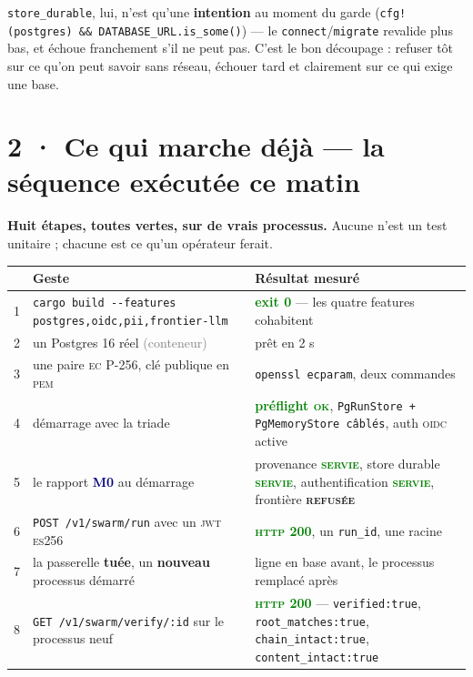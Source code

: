 \documentclass[10pt]{article}
\newcommand{\best}[1]{\textcolor{green}{\textbf{#1}}}
\newcommand{\moyen}[1]{\textcolor{amber}{\textbf{#1}}}
\newcommand{\sz}[1]{\textcolor{grey}{\small\textsf{#1}}}
\newcommand{\code}[1]{\texttt{\small #1}}
\newcommand{\mm}[1]{\textbf{\textcolor{navy}{#1}}}
\begin{document}
\code{store\_durable}, lui, n'est qu'une \textbf{intention} au moment du garde
(\code{cfg!(postgres) \&\& DATABASE\_URL.is\_some()}) --- le \code{connect}/\code{migrate} revalide
plus bas, et échoue franchement s'il ne peut pas. C'est le bon découpage : refuser tôt sur ce qu'on
peut savoir sans réseau, échouer tard et clairement sur ce qui exige une base.

\section{2 · Ce qui marche déjà --- la séquence exécutée ce matin}

\begin{acquis}
\textbf{Huit étapes, toutes vertes, sur de vrais processus.} Aucune n'est un test unitaire ; chacune
est ce qu'un opérateur ferait.
\end{acquis}

\begin{center}\small
\renewcommand{\arraystretch}{1.24}
\begin{tabular}{@{}c >{\raggedright\arraybackslash}p{7.0cm} >{\raggedright\arraybackslash}p{7.4cm}@{}}
\toprule
& \textbf{Geste} & \textbf{Résultat mesuré} \\
\midrule
1 & \code{cargo build -{}-features postgres,oidc,pii,frontier-llm} & \best{exit 0} --- les quatre features cohabitent \\
2 & un Postgres 16 réel \sz{(conteneur)} & prêt en 2 s \\
3 & une paire \textsc{ec} P-256, clé publique en \textsc{pem} & \code{openssl ecparam}, deux commandes \\
4 & démarrage avec la triade & \best{préflight \textsc{ok}}, \code{PgRunStore + PgMemoryStore câblés}, auth \textsc{oidc} active \\
5 & le rapport \mm{M0} au démarrage & provenance \best{\textsc{servie}}, store durable \best{\textsc{servie}}, authentification \best{\textsc{servie}}, frontière \moyen{\textsc{refusée}} \\
6 & \code{POST /v1/swarm/run} avec un \textsc{jwt} \textsc{es}256 & \best{\textsc{http} 200}, un \code{run\_id}, une racine \\
7 & la passerelle \textbf{tuée}, un \textbf{nouveau} processus démarré & 1 ligne en base avant, le processus remplacé après \\
8 & \code{GET /v1/swarm/verify/:id} sur le processus neuf & \best{\textsc{http} 200} --- \code{verified:true}, \code{root\_matches:true}, \code{chain\_intact:true}, \code{content\_intact:true} \\
\bottomrule
\end{tabular}
\end{center}
\end{document}
